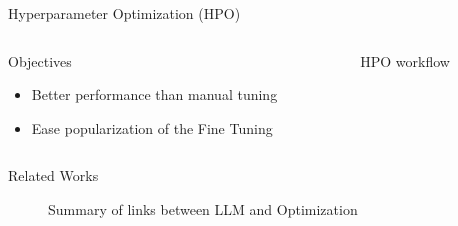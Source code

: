 \begin{frame}{Hyperparameter Optimization (HPO)}

    \begin{columns}
         
           \begin{column}{0.3\textwidth} 
           \begin{block}{Objectives}
            \begin{itemize}
                \item Better performance than manual tuning
                \item Ease popularization of the Fine Tuning
            \end{itemize}
            
           \end{block}
    
           \end{column}
               
           \begin{column}{0.7\textwidth}
            \begin{figure}
                \centering
                \resizebox{\textwidth}{!}{
                    
                }
                \caption{HPO workflow}
           \end{figure}  
           \end{column}
                
       \end{columns}

\end{frame}

\begin{frame}{Related Works}
    \begin{figure}
        \resizebox{0.9\textwidth}{!}{
            
        }
        \caption{Summary of links between LLM and Optimization}
    \end{figure}
    
    
\end{frame}